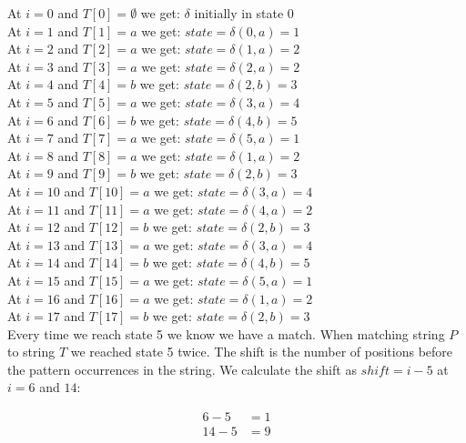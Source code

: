 \documentclass{article}
\begin{document}
At $i=0$ and $T[0]=\emptyset$ we get: $\delta$ initially in state 0\\
At $i=1$ and $T[1]=a$ we get: $state=\delta(0,a)=1$\\
At $i=2$ and $T[2]=a$ we get: $state=\delta(1,a)=2$\\
At $i=3$ and $T[3]=a$ we get: $state=\delta(2,a)=2$\\
At $i=4$ and $T[4]=b$ we get: $state=\delta(2,b)=3$\\
At $i=5$ and $T[5]=a$ we get: $state=\delta(3,a)=4$\\
At $i=6$ and $T[6]=b$ we get: $state=\delta(4,b)=5$\\
At $i=7$ and $T[7]=a$ we get: $state=\delta(5,a)=1$\\
At $i=8$ and $T[8]=a$ we get: $state=\delta(1,a)=2$\\
At $i=9$ and $T[9]=b$ we get: $state=\delta(2,b)=3$\\
At $i=10$ and $T[10]=a$ we get: $state=\delta(3,a)=4$\\
At $i=11$ and $T[11]=a$ we get: $state=\delta(4,a)=2$\\
At $i=12$ and $T[12]=b$ we get: $state=\delta(2,b)=3$\\
At $i=13$ and $T[13]=a$ we get: $state=\delta(3,a)=4$\\
At $i=14$ and $T[14]=b$ we get: $state=\delta(4,b)=5$\\
At $i=15$ and $T[15]=a$ we get: $state=\delta(5,a)=1$\\
At $i=16$ and $T[16]=a$ we get: $state=\delta(1,a)=2$\\
At $i=17$ and $T[17]=b$ we get: $state=\delta(2,b)=3$\\

Every time we reach state 5 we know we have a match. When matching string $P$ to string $T$ we reached state 5 twice. The shift is the number of positions before the pattern occurrences in the string. We calculate the shift as $shift = i - 5$ at $i = 6$ and $14$:

\begin{equation*} 
\begin{split}
    6 - 5 &= 1\\
    14 - 5 &= 9\\
\end{split}
\end{equation*}
\end{document}
